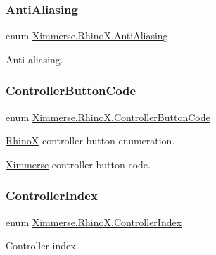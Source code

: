 \subsubsection{\texorpdfstring{Anti\+Aliasing}{AntiAliasing}}
{\footnotesize\ttfamily enum \mbox{\hyperlink{namespace_ximmerse_1_1_rhino_x_a6f6b7e0f3b580e31040b75578bbf4c94}{Ximmerse.\+Rhino\+X.\+Anti\+Aliasing}}\hspace{0.3cm}{\ttfamily [strong]}}



Anti aliasing. 

\mbox{\label{namespace_ximmerse_1_1_rhino_x_a99f73f11bba9d4b424daba6c5a5abc0b}} 
\subsubsection{\texorpdfstring{Controller\+Button\+Code}{ControllerButtonCode}}
{\footnotesize\ttfamily enum \mbox{\hyperlink{namespace_ximmerse_1_1_rhino_x_a99f73f11bba9d4b424daba6c5a5abc0b}{Ximmerse.\+Rhino\+X.\+Controller\+Button\+Code}}\hspace{0.3cm}{\ttfamily [strong]}}



\mbox{\hyperlink{namespace_ximmerse_1_1_rhino_x}{RhinoX}} controller button enumeration. 

\mbox{\hyperlink{namespace_ximmerse}{Ximmerse}} controller button code. \mbox{\label{namespace_ximmerse_1_1_rhino_x_a78c4d1657dc299dc9f91fad0ef234666}} 
\subsubsection{\texorpdfstring{Controller\+Index}{ControllerIndex}}
{\footnotesize\ttfamily enum \mbox{\hyperlink{namespace_ximmerse_1_1_rhino_x_a78c4d1657dc299dc9f91fad0ef234666}{Ximmerse.\+Rhino\+X.\+Controller\+Index}}\hspace{0.3cm}{\ttfamily [strong]}}



Controller index. 

